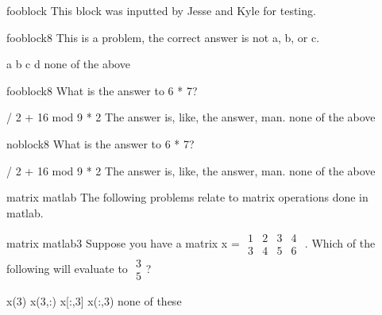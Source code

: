 \documentclass{exam}
\begin{document}
\begin{block}{fooblock}
This block was inputted by Jesse and Kyle for testing.
\end{block}

\begin{problem}[require=fooblock]{fooblock}{8} 
This is a problem, the correct answer is not a, b, or c.
  \begin{answers} 
    \answer a
    \answer b
    \answer c
    \answer [correct] d %
    \answer[fixed] none of the above %
  \end{answers}
\end{problem}

\begin{problem}[require=fooblock]{fooblock}{8} 
What is the answer to 6 * 7?
  \begin{answers} 
     / 2 + 16
     mod 9
     * 2 %
    \answer The answer is, like, the answer, man.
    \answer[fixed] none of the above %
  \end{answers}
\end{problem}


\begin{problem}[require=noblock]{noblock}{8} 
What is the answer to 6 * 7?
  \begin{answers} 
     / 2 + 16
     mod 9
     * 2 %
    \answer The answer is, like, the answer, man.
    \answer[fixed] none of the above %
  \end{answers}
\end{problem}

\begin{block}{matrix matlab}
The following problems relate to matrix operations done in matlab.
\end{block}

\begin{problem}[requires=matrix matlab]{matrix matlab}{3}
 Suppose you have a matrix x = \footnotesize
$\begin{array}{cccc}1 & 2 & 3 & 4\\3 & 4 & 5 & 6\end{array}$
\normalsize. Which of the following will evaluate to \footnotesize
$\begin{array}{c}3 \\ 5\end{array}$\normalsize?
  \begin{answers}   
    \answer x(3)
    \answer x(3,:)
    \answer x[:,3]
    \answer[correct] x(:,3) %
    \answer[fixed] none of these %
   \end{answers}
\end{problem}
\end{document}
